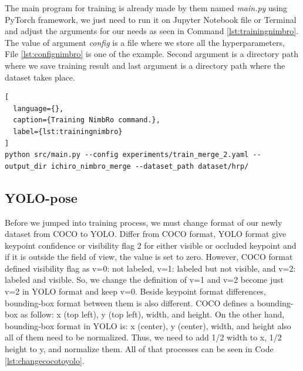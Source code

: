 The main program for training is already made by them named \emph{main.py} using PyTorch framework, we just need to run it on Jupyter Notebook file or Terminal and adjust the arguments for our needs
as seen in Command \ref{lst:trainingnimbro}. The value of argument \emph{config} is a file where we store all the hyperparameters, File \ref{lst:confignimbro} is one of the example.
Second argument is a directory path where we save training result and last argument is a directory path where the dataset takes place.

\begin{lstlisting}[
  language={},
  caption={Training NimbRo command.},
  label={lst:trainingnimbro}
]
python src/main.py --config experiments/train_merge_2.yaml --output_dir ichiro_nimbro_merge --dataset_path dataset/hrp/
\end{lstlisting}



\subsection{YOLO-pose}
\label{subsec:trainingyolopose}

Before we jumped into training process, we must change format of our newly dataset from COCO to YOLO. Differ from COCO format, YOLO format give keypoint confidence or visibility flag 2 for either visible or occluded keypoint
and if it is outside the field of view, the value is set to zero. However, COCO format defined visibility flag as v=0: not labeled,  v=1: labeled but not visible, and v=2: labeled and visible. So, we change the definition of
v=1 and v=2 become just v=2 in YOLO format and keep v=0.
Beside keypoint format differences, bounding-box format between them is also different. COCO defines a bounding-box as follow: x (top left), y (top left), width, and height. On the other hand,
bounding-box format in YOLO is: x (center), y (center), width, and height also all of them need to be normalized. Thus, we need to add 1/2 width to x, 1/2 height to y, and normalize them.
All of that processes can be seen in Code \ref{lst:changecocotoyolo}. 



